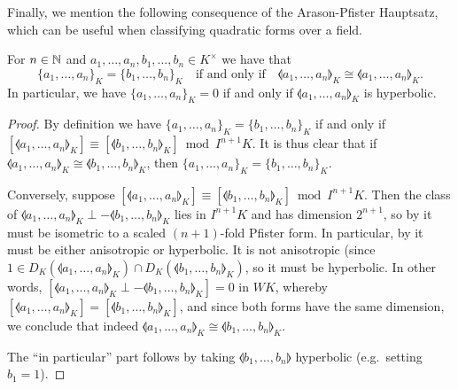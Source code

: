 \documentclass[12pt, leqno, british]{amsart}
\begin{document}
Finally, we mention the following consequence of the Arason-Pfister Hauptsatz, which can be useful when classifying quadratic forms over a field.
\begin{prop}\label{P:symb-equal}
For $n \in \mathbb N$ and $a_1, \ldots, a_n, b_1, \ldots, b_n \in K^\times$ we have that
$$ \lbrace a_1, \ldots, a_n \rbrace_K = \lbrace b_1, \ldots, b_n \rbrace_K \quad\text{if and only if}\quad \llangle a_1, \ldots, a_n \rrangle_K \cong \llangle a_1, \ldots, a_n \rrangle_K.$$
In particular, we have $\lbrace a_1, \ldots, a_n \rbrace_K = 0$ if and only if $\llangle a_1, \ldots, a_n \rrangle_K$ is hyperbolic.
\end{prop}
\begin{proof}
By definition we have $\lbrace a_1, \ldots, a_n \rbrace_K = \lbrace b_1, \ldots, b_n \rbrace_K$ if and only if $[\llangle a_1, \ldots, a_n \rrangle_K] \equiv [\llangle b_1, \ldots, b_n \rrangle_K] \bmod I^{n+1}K$.
It is thus clear that if $\llangle a_1, \ldots, a_n \rrangle_K \cong \llangle b_1, \ldots, b_n \rrangle_K$, then $\lbrace a_1, \ldots, a_n \rbrace_K = \lbrace b_1, \ldots, b_n \rbrace_K$.

Conversely, suppose $[\llangle a_1, \ldots, a_n \rrangle_K] \equiv [\llangle b_1, \ldots, b_n \rrangle_K] \bmod I^{n+1}K$.
Then the class of $\llangle a_1, \ldots, a_n \rrangle_K \perp -\llangle b_1, \ldots, b_n \rrangle_K$ lies in $I^{n+1}K$ and has dimension $2^{n+1}$, so by  it must be isometric to a scaled $(n+1)$-fold Pfister form.
In particular, by  it must be either anisotropic or hyperbolic.
It is not anisotropic (since $1 \in D_K(\llangle a_1, \ldots, a_n \rrangle_K) \cap D_K(\llangle b_1, \ldots, b_n \rrangle_K)$, so it must be hyperbolic.
In other words, $[\llangle a_1, \ldots, a_n \rrangle_K \perp -\llangle b_1, \ldots, b_n \rrangle_K] = 0$ in $WK$, whereby $[\llangle a_1, \ldots, a_n \rrangle_K] = [\llangle b_1, \ldots, b_n \rrangle_K]$, and since both forms have the same dimension, we conclude that indeed $\llangle a_1, \ldots, a_n \rrangle_K \cong \llangle b_1, \ldots, b_n \rrangle_K$.

The ``in particular'' part follows by taking $\llangle b_1, \ldots, b_n \rrangle$ hyperbolic (e.g.~setting $b_1 = 1$).
\end{proof}
\end{document}
